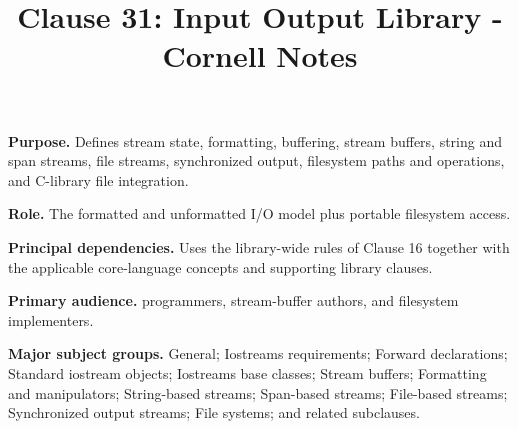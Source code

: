 \documentclass[11pt,letterpaper]{article}
\title{Clause 31: Input Output Library - Cornell Notes}
\author{}
\date{}
\begin{document}
\maketitle
\begin{CornellReferenceOrientationBox}
\textbf{Purpose.} Defines stream state, formatting, buffering, stream buffers, string and span streams, file streams, synchronized output, filesystem paths and operations, and C-library file integration.
\par\textbf{Role.} The formatted and unformatted I/O model plus portable filesystem access.
\par\textbf{Principal dependencies.} Uses the library-wide rules of Clause 16 together with the applicable core-language concepts and supporting library clauses.
\par\textbf{Primary audience.} programmers, stream-buffer authors, and filesystem implementers.
\par\textbf{Major subject groups.} General; Iostreams requirements; Forward declarations; Standard iostream objects; Iostreams base classes; Stream buffers; Formatting and manipulators; String-based streams; Span-based streams; File-based streams; Synchronized output streams; File systems; and related subclauses.
\end{CornellReferenceOrientationBox}
\end{document}
